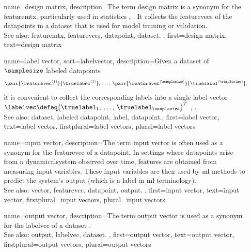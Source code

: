 {name={design matrix},
	description={The term design \gls{matrix} is a synonym 
 		for the \gls{featuremtx}, particularly used in statistics \cite{OxfordStatisticsDictionary}, \cite{Everitt2022}. 
 		It collects the \glspl{featurevec} of the \glspl{datapoint} in a \gls{dataset} 
 		that is used for \gls{model} \gls{training} or \gls{validation}.
		\\
		See also: \gls{featuremtx}, \glspl{featurevec}, \gls{datapoint}, \gls{dataset}. }, 
 	first={design matrix},
 	text={design matrix} 
}

{name={label vector},
sort={labelvector},
	description={Given a \gls{dataset} of $\samplesize$ \glspl{labeled datapoint} 
 		$$\pair{\featurevec^{(1)}}{\truelabel^{(1)}}, \,\ldots, \,\pair{\featurevec^{(\samplesize)}}{\truelabel^{(\samplesize)}},$$ it 
 		is convenient to collect the corresponding \glspl{label} into a single 
 		\gls{label} \gls{vector} $\labelvec \defeq \big( \truelabel_{1},\,\ldots,\,\truelabel_{\samplesize}\big)^{T}$ 
 		\cite{BishopBook}, \cite{hastie01statisticallearning}. 
 		\\
 		See also: \gls{dataset}, \gls{labeled datapoint}, \gls{label}, \gls{datapoint}.},
 	first={label vector},
 	text={label vector}, 
 	firstplural={label vectors},
 	plural={label vectors}
}

{name={input vector},
	description={The term input \gls{vector} is often used 
		as a synonym for the \gls{featurevec} of a \gls{datapoint}. In settings where \glspl{datapoint} 
 		arise from a \gls{dynamicalsystem} observed over time, \glspl{feature} are obtained 
 		from measuring input variables. These input variables are then used 
 		by \gls{ml} methods to predict the system’s \gls{output} (which is a \gls{label} in \gls{ml} terminology).
		\\
		See also: \gls{vector}, \gls{featurevec}, \gls{datapoint}, \gls{output}. }, 
 	first={input vector}, 
 	text={input vector}, 
 	firstplural={input vectors}, 
 	plural={input vectors}
}

{name={output vector},
	description={The term \gls{output} \gls{vector} is used 
 		as a synonym for the \gls{labelvec} of a \gls{dataset} \cite{Murphy2012}.
		\\
		See also: \gls{output}, \gls{labelvec}, \gls{dataset}. },  
 	first={output vector}, 
 	text={output vector}, 
 	firstplural={output vectors}, 
 	plural={output vectors}
}

